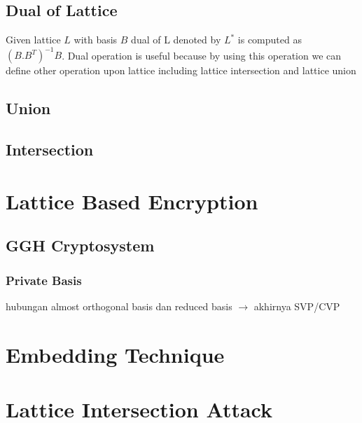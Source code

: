 \subsection{Dual of Lattice}
Given lattice $L$ with basis $B$ dual of L denoted by $L^*$ is computed as $(B.B^{T})^{-1}B$. Dual operation is useful because by using this operation we can define other operation upon lattice including lattice intersection and lattice union
\subsection{Union}

\subsection{Intersection}

\section{Lattice Based Encryption}
\subsection{GGH Cryptosystem}
\subsubsection{Private Basis}
hubungan almost orthogonal basis dan reduced basis $\to$ akhirnya SVP/CVP
\section{Embedding Technique}
\section{Lattice Intersection Attack}

